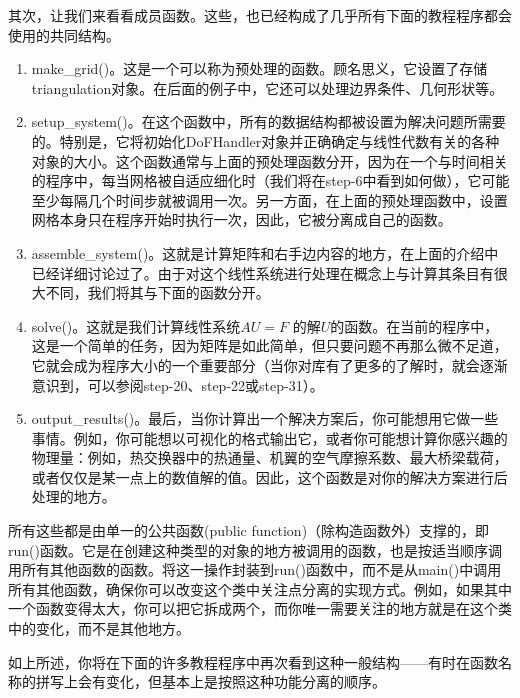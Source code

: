 \documentclass[nofonts]{ctexart} %
\begin{document}
其次，让我们来看看成员函数。这些，也已经构成了几乎所有下面的教程程序都会使用的共同结构。
\begin{enumerate}
    \item make\_grid()。这是一个可以称为预处理的函数。顾名思义，它设置了存储triangulation对象。在后面的例子中，它还可以处理边界条件、几何形状等。
    \item setup\_system()。在这个函数中，所有的数据结构都被设置为解决问题所需要的。特别是，它将初始化DoFHandler对象并正确确定与线性代数有关的各种对象的大小。这个函数通常与上面的预处理函数分开，因为在一个与时间相关的程序中，每当网格被自适应细化时（我们将在step-6中看到如何做），它可能至少每隔几个时间步就被调用一次。另一方面，在上面的预处理函数中，设置网格本身只在程序开始时执行一次，因此，它被分离成自己的函数。
    \item assemble\_system()。这就是计算矩阵和右手边内容的地方，在上面的介绍中已经详细讨论过了。由于对这个线性系统进行处理在概念上与计算其条目有很大不同，我们将其与下面的函数分开。
    \item solve()。这就是我们计算线性系统$AU=F$
    的解$U$的函数。在当前的程序中，这是一个简单的任务，因为矩阵是如此简单，但只要问题不再那么微不足道，它就会成为程序大小的一个重要部分（当你对库有了更多的了解时，就会逐渐意识到，可以参阅step-20、step-22或step-31）。
    \item output\_results()。最后，当你计算出一个解决方案后，你可能想用它做一些事情。例如，你可能想以可视化的格式输出它，或者你可能想计算你感兴趣的物理量：例如，热交换器中的热通量、机翼的空气摩擦系数、最大桥梁载荷，或者仅仅是某一点上的数值解的值。因此，这个函数是对你的解决方案进行后处理的地方。
\end{enumerate}
所有这些都是由单一的公共函数(public function)（除构造函数外）支撑的，即run()函数。它是在创建这种类型的对象的地方被调用的函数，也是按适当顺序调用所有其他函数的函数。将这一操作封装到run()函数中，而不是从main()中调用所有其他函数，确保你可以改变这个类中关注点分离的实现方式。例如，如果其中一个函数变得太大，你可以把它拆成两个，而你唯一需要关注的地方就是在这个类中的变化，而不是其他地方。

    如上所述，你将在下面的许多教程程序中再次看到这种一般结构——有时在函数名称的拼写上会有变化，但基本上是按照这种功能分离的顺序。
\end{document}
